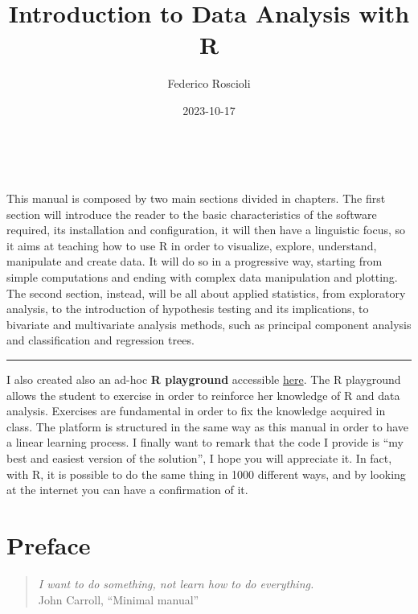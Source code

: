 \documentclass[
]{article}
\title{Introduction to Data Analysis with R}
\author{Federico Roscioli}
\date{2023-10-17}
\begin{document}
\maketitle

\newpage{}

{
\hypersetup{linkcolor=}
\setcounter{tocdepth}{3}
\tableofcontents
}
\pagebreak

~
\pagebreak

This manual is composed by two main sections divided in chapters. The
first section will introduce the reader to the basic characteristics of
the software required, its installation and configuration, it will then
have a linguistic focus, so it aims at teaching how to use R in order to
visualize, explore, understand, manipulate and create data. It will do
so in a progressive way, starting from simple computations and ending
with complex data manipulation and plotting. The second section,
instead, will be all about applied statistics, from exploratory
analysis, to the introduction of hypothesis testing and its
implications, to bivariate and multivariate analysis methods, such as
principal component analysis and classification and regression trees.

\begin{center}\rule{0.5\linewidth}{0.5pt}\end{center}

I also created also an ad-hoc \textbf{R playground} accessible
\href{https://federicoroscioli.shinyapps.io/exercises/}{here}. The R
playground allows the student to exercise in order to reinforce her
knowledge of R and data analysis. Exercises are fundamental in order to
fix the knowledge acquired in class. The platform is structured in the
same way as this manual in order to have a linear learning process. I
finally want to remark that the code I provide is ``my best and easiest
version of the solution'', I hope you will appreciate it. In fact, with
R, it is possible to do the same thing in 1000 different ways, and by
looking at the internet you can have a confirmation of it.

\hypertarget{preface}{%
\section*{Preface}\label{preface}}

\justifying

\begin{quote}
\emph{I want to do something, not learn how to do everything.}\\
John Carroll, ``Minimal manual''
\end{quote}
\end{document}
